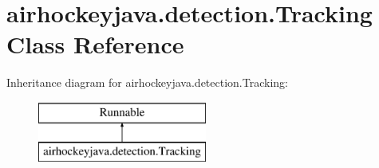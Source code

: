 \hypertarget{classairhockeyjava_1_1detection_1_1_tracking}{}\section{airhockeyjava.\+detection.\+Tracking Class Reference}
\label{classairhockeyjava_1_1detection_1_1_tracking}
Inheritance diagram for airhockeyjava.\+detection.\+Tracking\+:\begin{figure}[H]
\begin{center}
\leavevmode
\includegraphics[height=2.000000cm]{classairhockeyjava_1_1detection_1_1_tracking}
\end{center}
\end{figure}
